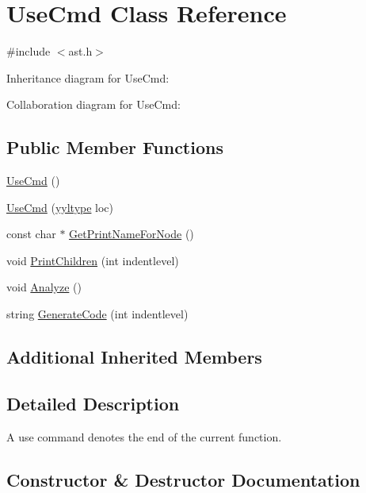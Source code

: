 \hypertarget{class_use_cmd}{}\section{Use\+Cmd Class Reference}
\label{class_use_cmd}


{\ttfamily \#include $<$ast.\+h$>$}



Inheritance diagram for Use\+Cmd\+:


Collaboration diagram for Use\+Cmd\+:
\subsection*{Public Member Functions}
\begin{DoxyCompactItemize}
\item 
\hyperlink{class_use_cmd_ac609ee5d62f7ff96ff56f03c1cabba2c}{Use\+Cmd} ()
\item 
\hyperlink{class_use_cmd_ae0dc39f5419dd6a38c7c5a46ef67f823}{Use\+Cmd} (\hyperlink{structyyltype}{yyltype} loc)
\item 
const char $\ast$ \hyperlink{class_use_cmd_af70d8365f4c00d243bd72a336d21c99b}{Get\+Print\+Name\+For\+Node} ()
\item 
void \hyperlink{class_use_cmd_ae8b6bad04d432107afa86f5b6ab98db9}{Print\+Children} (int indentlevel)
\item 
void \hyperlink{class_use_cmd_a3da3017201b8b7573481cf58c4702050}{Analyze} ()
\item 
string \hyperlink{class_use_cmd_aa8f27d2684e401c1f7c58cdfa7c50696}{Generate\+Code} (int indentlevel)
\end{DoxyCompactItemize}
\subsection*{Additional Inherited Members}


\subsection{Detailed Description}
A use command denotes the end of the current function. 

\subsection{Constructor \& Destructor Documentation}
\mbox{\label{class_use_cmd_ac609ee5d62f7ff96ff56f03c1cabba2c}} 
